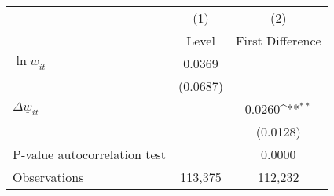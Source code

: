{
\def\sym#1{\ifmmode^{#1}\else\(^{#1}\)\fi}
\begin{tabular}{l*{2}{c}}
\hline\hline
          &\multicolumn{1}{c}{(1)}&\multicolumn{1}{c}{(2)}\\
          &\multicolumn{1}{c}{Level}&\multicolumn{1}{c}{First Difference}\\
\hline
$\ln \underline{w}_{it}$&   0.0369         &                  \\
          & (0.0687)         &                  \\
[1em]
$\Delta \underline{w}_{it}$&                  &   0.0260\sym{**} \\
          &                  & (0.0128)         \\
\hline
P-value autocorrelation test&                  &   0.0000         \\
Observations&  113,375         &  112,232         \\
\hline\hline
\end{tabular}
}
